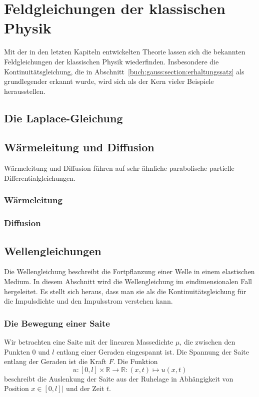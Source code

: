 %
%
%
\chapter{Feldgleichungen der klassischen Physik
\label{chapter:feldgleichungen}}
Mit der in den letzten Kapiteln entwickelten Theorie lassen sich
die bekannten Feldgleichungen der klassischen Physik wiederfinden.
Insbesondere die Kontinuitätsgleichung, die in
Abschnitt~\ref{buch:gauss:section:erhaltungssatz}
als grundlegender erkannt wurde,
wird sich als der Kern vieler Beispiele herausstellen.

\section{Die Laplace-Gleichung}

%
%
\section{Wärmeleitung und Diffusion}
Wärmeleitung und Diffusion führen auf sehr ähnliche parabolische
partielle Differentialgleichungen.

%
%
\subsection{Wärmeleitung}

%
%
\subsection{Diffusion}

%
%
\section{Wellengleichungen}
Die Wellengleichung beschreibt die Fortpflanzung einer Welle
in einem elastischen Medium.
In diesem Abschnitt wird die Wellengleichung im eindimensionalen
Fall hergeleitet.
Es stellt sich heraus, dass man sie als die Kontinuitätsgleichung
für die Impulsdichte und den Impulsstrom verstehen kann.

%
%
\subsection{Die Bewegung einer Saite}
%
Wir betrachten eine Saite mit der linearen Massedichte $\mu$, die
zwischen den Punkten $0$ und $l$ entlang einer Geraden eingespannt
ist.
Die Spannung der Saite entlang der Geraden ist die Kraft $F$.
Die Funktion
\[
u
\colon
[0,l]\times \mathbb{R}
\to
\mathbb{R}
:
(x,t)
\mapsto
u(x,t)
\]
beschreibt die Auslenkung der Saite aus der Ruhelage in Abhängigkeit
von Position $x\in[0,l]|$ und der Zeit $t$.

